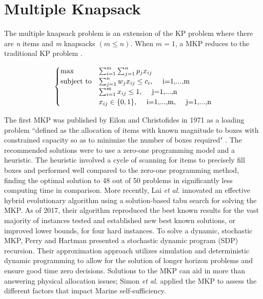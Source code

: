 
\section{Multiple Knapsack}
The multiple knapsack problem is an extension of the KP problem where there are \textit{n} items and \textit{m} knapsacks $(m\leq n)$. When $m=1$, a MKP reduces to the traditional KP problem \cite{MKPChapter}. 

\begin{align}
\begin{cases}
\max 				&\sum_{i=1}^m\sum_{j=1}^n p_jx_{ij} \\
\text{subject to}   &\sum_{j=1}^n w_jx_{ij}\leq c_i \text{,}	 \hspace{5mm}\text{i=1,...,m}\\
					&\sum_{i=1}^m x_{ij}\leq 1 		\text{,} 	 \hspace{5mm}\text{j=1,...,n}\\
					&x_{ij} \in \{0,1\} 				\text{,} \hspace{5mm}\text{i=1,...,m} \text{,}	 \hspace{5mm}\text{j=1,...,n}
\end{cases}
\end{align}

The first MKP was published by Eilon and Christofides \cite{EilonChristofides1971} in 1971 as a loading problem ``defined as the allocation of items with known magnitude to boxes with constrained capacity so as to minimize the number of boxes required" \cite{EilonChristofides1971}.  The recommended solutions were to use a zero-one programming model and a heuristic.  The heuristic involved a cycle of scanning for items to precisely fill boxes and performed well compared to the zero-one programming method, finding the optimal solution to 48 out of 50 problems in significantly less computing time in comparison.  More recently, Lai \textit{et al.} \cite{Lai2018} innovated an effective hybrid evolutionary algorithm using a solution-based tabu search for solving the MKP. As of 2017, their algorithm reproduced the best known results for the vast majority of instances tested and established new best known solutions, or improved lower bounds, for four hard instances.  To solve a dynamic, stochastic MKP, Perry and Hartman \cite{Perry2009} presented a stochastic dynamic program (SDP) recursion. Their approximation approach utilizes simulation and deterministic dynamic programming  to allow for the solution of longer horizon problems and ensure good time zero decisions. 
Solutions to the MKP can aid in more than answering physical allocation issues; Simon \textit{et al.} \cite{Simon2017} applied the MKP to assess the different factors that impact Marine self-sufficiency.


